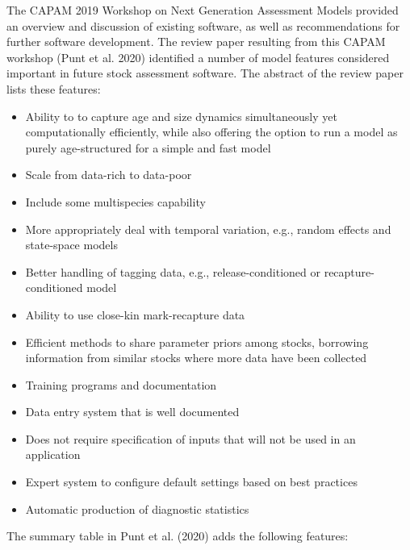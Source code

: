 \documentclass{SCreport}
\begin{document}
The CAPAM 2019 Workshop on Next Generation Assessment Models provided an
overview and discussion of existing software, as well as recommendations for
further software development. The review paper resulting from this CAPAM
workshop (Punt et al. 2020) identified a number of model features considered
important in future stock assessment software. The abstract of the review paper
lists these features:

\begin{itemize}
  \item Ability to to capture age and size dynamics simultaneously yet
  computationally efficiently, while also offering the option to run a model as
  purely age-structured for a simple and fast model
  \item Scale from data-rich to data-poor
  \item Include some multispecies capability
  \item More appropriately deal with temporal variation, e.g., random effects
  and state-space models
  \item Better handling of tagging data, e.g., release-conditioned or
  recapture-conditioned model
  \item Ability to use close-kin mark-recapture data
  \item Efficient methods to share parameter priors among stocks, borrowing
  information from similar stocks where more data have been collected
  \item Training programs and documentation
  \item Data entry system that is well documented
  \item Does not require specification of inputs that will not be used in an
  application
  \item Expert system to configure default settings based on best practices
  \item Automatic production of diagnostic statistics
\end{itemize}

The summary table in Punt et al. (2020) adds the following features:
\end{document}
